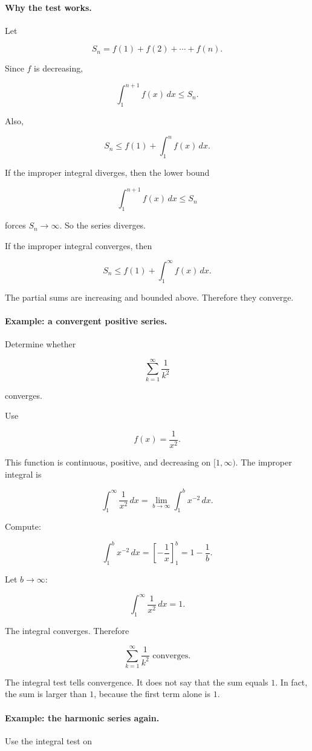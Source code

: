 \paragraph{Why the test works.}
Let

\[
S_n=f(1)+f(2)+\cdots+f(n).
\]

Since \(f\) is decreasing,

\[
\int_1^{n+1} f(x)\,dx\le S_n.
\]

Also,

\[
S_n\le f(1)+\int_1^n f(x)\,dx.
\]

If the improper integral diverges, then the lower bound

\[
\int_1^{n+1} f(x)\,dx\le S_n
\]

forces \(S_n\to\infty\).  So the series diverges.

If the improper integral converges, then

\[
S_n\le f(1)+\int_1^{\infty}f(x)\,dx.
\]

The partial sums are increasing and bounded above.  Therefore they converge.

\paragraph{Example: a convergent positive series.}
Determine whether

\[
\sum_{k=1}^{\infty}\frac1{k^2}
\]

converges.

Use

\[
f(x)=\frac1{x^2}.
\]

This function is continuous, positive, and decreasing on \([1,\infty)\).  The improper
integral is

\[
\int_1^{\infty}\frac1{x^2}\,dx
=
\lim_{b\to\infty}\int_1^b x^{-2}\,dx.
\]

Compute:

\[
\int_1^b x^{-2}\,dx
=
\left[-\frac1x\right]_1^b
=
1-\frac1b.
\]

Let \(b\to\infty\):

\[
\int_1^{\infty}\frac1{x^2}\,dx=1.
\]

The integral converges.  Therefore

\[
\boxed{
\sum_{k=1}^{\infty}\frac1{k^2} \text{ converges.}
}
\]

The integral test tells convergence.  It does not say that the sum equals \(1\).  In fact,
the sum is larger than \(1\), because the first term alone is \(1\).

\paragraph{Example: the harmonic series again.}
Use the integral test on

